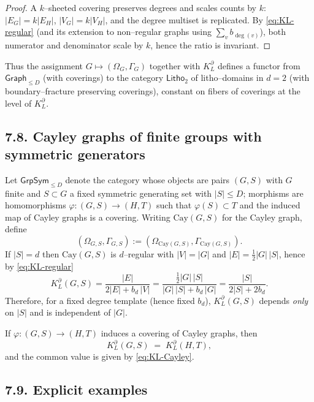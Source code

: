 \begin{proof}
A $k$–sheeted covering preserves degrees and scales counts by $k$: $|E_G|=k|E_H|$, $|V_G|=k|V_H|$, and the degree multiset is replicated. By \eqref{eq:KL-regular} (and its extension to non–regular graphs using $\sum_{v} b_{\deg(v)}$), both numerator and denominator scale by $k$, hence the ratio is invariant.
\end{proof}

Thus the assignment $G\mapsto (\Omega_G,\Gamma_G)$ together with $K_L^\partial$ defines a functor from $\mathsf{Graph}_{\le D}$ (with coverings) to the category $\mathsf{Litho}_2$ of litho–domains in $d=2$ (with boundary–fracture preserving coverings), constant on fibers of coverings at the level of $K_L^\partial$.

\subsection*{7.8. Cayley graphs of finite groups with symmetric generators}
Let $\mathsf{GrpSym}_{\le D}$ denote the category whose objects are pairs $(G,S)$ with $G$ finite and $S\subset G$ a fixed symmetric generating set with $|S|\le D$; morphisms are homomorphisms $\varphi:(G,S)\to (H,T)$ such that $\varphi(S)\subset T$ and the induced map of Cayley graphs is a covering. Writing $\mathrm{Cay}(G,S)$ for the Cayley graph, define
\[
(\Omega_{G,S},\Gamma_{G,S}) := (\Omega_{\mathrm{Cay}(G,S)},\Gamma_{\mathrm{Cay}(G,S)}).
\]
If $|S|=d$ then $\mathrm{Cay}(G,S)$ is $d$–regular with $|V|=|G|$ and $|E|=\tfrac12|G|\,|S|$, hence by \eqref{eq:KL-regular}
\begin{equation}\label{eq:KL-Cayley}
K_L^\partial(G,S)
= \frac{|E|}{2|E| + b_d\,|V|}
= \frac{\tfrac12|G|\,|S|}{|G|\,|S| + b_d\,|G|}
= \frac{|S|}{2|S|+2b_d}.
\end{equation}
Therefore, for a fixed degree template (hence fixed $b_d$), $K_L^\partial(G,S)$ depends \emph{only} on $|S|$ and is independent of $|G|$.

\begin{corollary}
If $\varphi:(G,S)\to (H,T)$ induces a covering of Cayley graphs, then
\[
K_L^\partial(G,S) \;=\; K_L^\partial(H,T),
\]
and the common value is given by \eqref{eq:KL-Cayley}.
\end{corollary}

\subsection*{7.9. Explicit examples}
